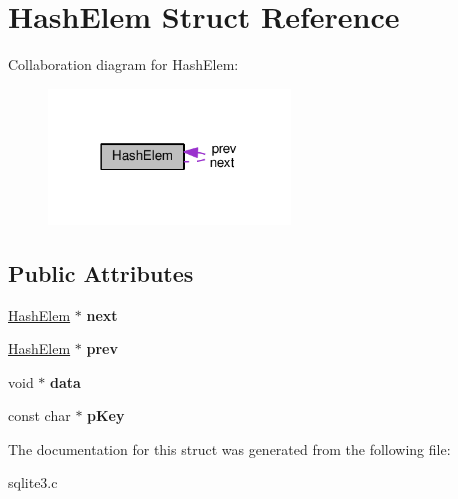 \hypertarget{structHashElem}{}\section{Hash\+Elem Struct Reference}
\label{structHashElem}


Collaboration diagram for Hash\+Elem\+:\nopagebreak
\begin{figure}[H]
\begin{center}
\leavevmode
\includegraphics[width=182pt]{structHashElem__coll__graph}
\end{center}
\end{figure}
\subsection*{Public Attributes}
\begin{DoxyCompactItemize}
\item 
\hyperlink{structHashElem}{Hash\+Elem} $\ast$ {\bfseries next}\hypertarget{structHashElem_a2d28fad45ff21ffb8a02a7133df860fd}{}\label{structHashElem_a2d28fad45ff21ffb8a02a7133df860fd}

\item 
\hyperlink{structHashElem}{Hash\+Elem} $\ast$ {\bfseries prev}\hypertarget{structHashElem_ae4d011c0dc807a3c100ccdb927dd0ba9}{}\label{structHashElem_ae4d011c0dc807a3c100ccdb927dd0ba9}

\item 
void $\ast$ {\bfseries data}\hypertarget{structHashElem_ac7e80f63ba2f82457ff68aa0cd360365}{}\label{structHashElem_ac7e80f63ba2f82457ff68aa0cd360365}

\item 
const char $\ast$ {\bfseries p\+Key}\hypertarget{structHashElem_a9c33a7c8ac467a5547a123338daf61f4}{}\label{structHashElem_a9c33a7c8ac467a5547a123338daf61f4}

\end{DoxyCompactItemize}


The documentation for this struct was generated from the following file\+:\begin{DoxyCompactItemize}
\item 
sqlite3.\+c\end{DoxyCompactItemize}
